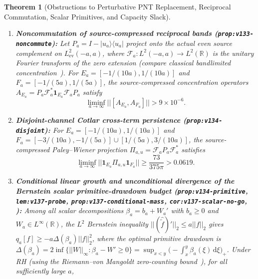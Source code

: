 \documentclass[11pt]{article}
\def\norm#1{||#1||}%
\newtheorem{theorem}{Theorem}[section]
\theoremstyle{remark}
\newcommand{\norm}[1]{\left\lVert #1\right\rVert}
\newcommand{\dd}{\mathrm d}
\begin{document}
\begin{theorem}[Obstructions to Perturbative PNT Replacement, Reciprocal Commutation, Scalar Primitives, and Capacity Slack]
\begin{enumerate}[label=(\alph*)]
\begin{equation}
\begin{aligned}
    \beta_{\log 4}(1) &\in \bigl(-0.640027118160897146421661394744768547319369747,\\
    &\phantom{\in\bigl(}\,-0.640027118160897146421661394744768547319369746\bigr) < -\frac{3}{5}, \\
    \beta_{\log 4}(1) &\in (-0.640150, -0.639904) < -\frac{3}{5}.
  \end{aligned}
  \end{equation}
  Hence the unconstrained $L^2(\mathbb{R})$ multiplier $\beta_{\log 4}(\xi)$ has infinite negative index even after any fixed finite number of homogeneous linear constraints, whereas its Paley--Wiener physical compression $\mathsf{W}_4^{\mathrm{ev}}$ is nonnegative by Theorem~\ref{thm:lambda4-positivity}.
  \item \textbf{Noncommutation of source-compressed reciprocal bands (\texttt{prop:v133-noncommute}):} Let $P_a = I - |u_a\rangle\langle u_a|$ project onto the actual even source complement on $L^2_{\mathrm{ev}}(-a,a)$, where $\mathcal{F}_a : L^2(-a,a) \to L^2(\mathbb{R})$ is the unitary Fourier transform of the zero extension (compare classical bandlimited concentration~\cite{LandauPollak1961,Nazarov1994,Kovrijkine2000}). For $E_a = [-1/(10a), 1/(10a)]$ and $F_a = [-1/(5a), 1/(5a)]$, the source-compressed concentration operators $A_{E_a} = P_a \mathcal{F}_a^* \mathbf{1}_{E_a}\mathcal{F}_a P_a$ satisfy
  \begin{equation}\label{eq:commutator-lower}
    \liminf_{a \to \infty} \norm{[A_{E_a}, A_{F_a}]} > 9 \times 10^{-6}.
  \end{equation}
  \item \textbf{Disjoint-channel Cotlar cross-term persistence (\texttt{prop:v134-disjoint}):} For $E_a = [-1/(10a), 1/(10a)]$ and $F_a = [-3/(10a), -1/(5a)] \cup [1/(5a), 3/(10a)]$, the source-compressed Paley--Wiener projection $\Pi_{a,u} = \mathcal{F}_a P_a \mathcal{F}_a^*$ satisfies
  \begin{equation}\label{eq:cotlar-lower}
    \liminf_{a \to \infty} \norm{\mathbf{1}_{E_a}\Pi_{a,u}\mathbf{1}_{F_a}} \ge \frac{73}{375\pi} > 0.0619.
  \end{equation}
  \item \textbf{Conditional linear growth and unconditional divergence of the Bernstein scalar primitive-drawdown budget (\texttt{prop:v134-\allowbreak primitive}, \texttt{lem:v137-\allowbreak probe}, \texttt{prop:v137-\allowbreak conditional-\allowbreak mass}, \texttt{cor:v137-\allowbreak scalar-\allowbreak no-\allowbreak go}, ):} Among all scalar decompositions $\beta_a = b_a + W_a'$ with $b_a \ge 0$ and $W_a \in L^\infty(\mathbb{R})$, the $L^2$ Bernstein inequality $\norm{(\widehat{\widetilde{f}})'}_2 \le a\norm{f}_2$ gives $q_a[f] \ge -a\Delta(\beta_a)\norm{f}_2^2$, where the optimal primitive drawdown is $\Delta(\beta_a) = 2\inf\{\norm{W}_\infty : \beta_a - W' \ge 0\} = \sup_{x<y}\bigl(-\int_x^y \beta_a(\xi)\,\dd\xi\bigr)_+$. Under RH (using the Riemann--von Mangoldt zero-counting bound~\cite{HasanalizadeShenWong2022}), for all sufficiently large $a$,

\end{enumerate}
\end{theorem}
\end{document}
